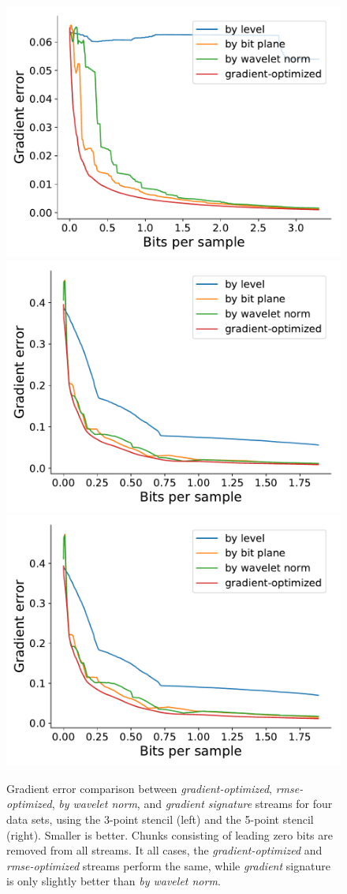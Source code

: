 \begin{figure}
	{\includegraphics[width=0.48\linewidth]{img/gradient/5points/gradient-optimized-sinusoid.pdf}}
	{\includegraphics[width=0.48\linewidth]{img/gradient/3points/gradient-optimized-velocityz.pdf}}
	{\includegraphics[width=0.48\linewidth]{img/gradient/5points/gradient-optimized-velocityz.pdf}}
	\caption{Gradient error comparison between \emph{gradient-optimized}, \emph{rmse-optimized},
	\emph{by wavelet norm}, and \emph{gradient signature} streams for four data sets, using the
	3-point stencil (left) and the 5-point stencil (right). Smaller is better. Chunks consisting of
	leading zero bits are removed from all streams. It all cases, the \emph{gradient-optimized} and
	\emph{rmse-optimized} streams perform the same, while \emph{gradient} signature is only slightly
	better than \emph{by wavelet norm}.}
	\label{fig:gradient-error-comparison}
\end{figure}

